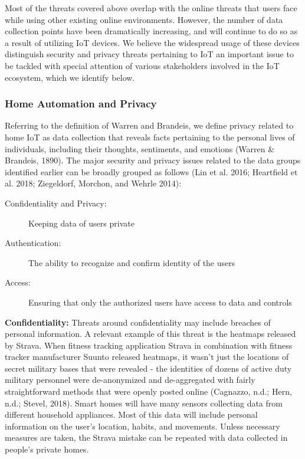 Most of the threats covered above overlap with the online threats that users face while using other existing online environments. However, the number of data collection points have been dramatically increasing, and will continue to do so as a result of utilizing IoT devices. We believe the widespread usage of these devices distinguish security and privacy threats pertaining to IoT an important issue to be tackled with special attention of various stakeholders involved in the IoT ecosystem, which we identify below.

\subsubsection{Home Automation and Privacy}
Referring to the definition of Warren and Brandeis, we define privacy related to home IoT as data collection that reveals facts pertaining to the personal lives of individuals, including their thoughts, sentiments, and emotions (Warren \& Brandeis, 1890). The major security and privacy issues related to the data groups identified earlier can be broadly grouped as follows (Lin et al. 2016; Heartfield et al. 2018; Ziegeldorf, Morchon, and Wehrle 2014):

\begin{description}
\item [Confidentiality and Privacy:] Keeping data of users private
\item [Authentication:] The ability to recognize and confirm identity of the users
\item [Access:] Ensuring that only the authorized users have access to data and controls
\end{description}

{\bf Confidentiality:} Threats around confidentiality may include breaches of personal information. A relevant example of this threat is the heatmaps released by Strava. When fitness tracking application Strava in combination with fitness tracker manufacturer Suunto released heatmaps, it wasn’t just the locations of secret military bases that were revealed - the identities of dozens of active duty military personnel were de-anonymized and de-aggregated with fairly straightforward methods that were openly posted online (Cagnazzo, n.d.; Hern, n.d.; Stevel, 2018). Smart homes will have many sensors collecting data from different household appliances. Most of this data will include personal information on the user’s location, habits, and movements. Unless necessary measures are taken, the Strava mistake can be repeated with data collected in people’s private homes.

